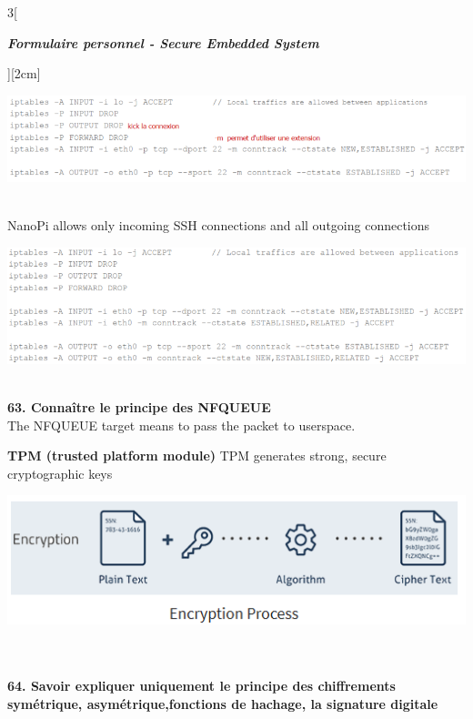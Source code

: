 \begin{multicols}{3}[\centerline{ \large\em \textbf{Formulaire personnel - Secure Embedded System}}][2cm]
\begin{minipage}{\linewidth}
	\centering
    \includegraphics[width =0.8\columnwidth]{images/43.png}
\end{minipage}\\
NanoPi allows only incoming SSH connections and all outgoing connections\\
\begin{minipage}{\linewidth}
	\centering
    \includegraphics[width =0.8\columnwidth]{images/44.png}
\end{minipage}
\\ \textbf{63. Connaître le principe des NFQUEUE\\}
The NFQUEUE target means to pass the packet to userspace.\\
\columnbreak

{\Large \textbf{TPM (trusted platform module)}}
TPM generates strong, secure cryptographic keys\\
\begin{minipage}{\linewidth}
	\centering
    \includegraphics[width =0.6\columnwidth]{images/53.png}
\end{minipage}\\
\\ \textbf{64. Savoir expliquer uniquement le principe des chiffrements symétrique, asymétrique,fonctions de hachage, la signature digitale\\}


\end{multicols}
